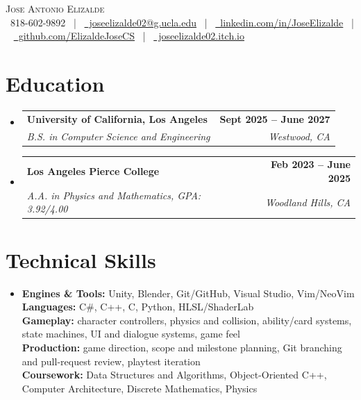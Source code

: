 \documentclass[letterpaper,11pt]{article}
\makeatletter
\newcommand{\resumeSubheading}[4]{
  \vspace{-4pt}\item
  \begin{tabular*}{1.0\textwidth}[t]{l@{\extracolsep{\fill}}r}
    \textbf{#1} & \textbf{\small #2} \\
    \textit{\small #3} & \textit{\small #4} \\
  \end{tabular*}\vspace{-7pt}
}
\newcommand{\resumeSubHeadingListStart}{\begin{itemize}[leftmargin=0in, label={}]}
\newcommand{\resumeSubHeadingListEnd}{\end{itemize}}
\makeatother
\begin{document}
\begin{center}
    {\huge \scshape Jose Antonio Elizalde} \\ \vspace{0pt}
    \small
    \faPhone\ 818-602-9892 ~|~
    \href{mailto:joseelizalde02@g.ucla.edu}{\faEnvelope\ joseelizalde02@g.ucla.edu} ~|~
    \href{https://www.linkedin.com/in/jose-elizalde-184781342/}{\faLinkedin\ linkedin.com/in/JoseElizalde} ~|~
    \href{https://github.com/ElizaldeJoseCS}{\faGithub\ github.com/ElizaldeJoseCS} ~|~
    \href{https://joseelizalde02.itch.io/}{\faGamepad\ joseelizalde02.itch.io}
\end{center}

\section{Education}
\resumeSubHeadingListStart
  \resumeSubheading
    {University of California, Los Angeles}{Sept 2025 -- June 2027}
    {B.S. in Computer Science and Engineering}{Westwood, CA}
  \resumeSubheading
    {Los Angeles Pierce College}{Feb 2023 -- June 2025}
    {A.A. in Physics and Mathematics, GPA: 3.92/4.00}{Woodland Hills, CA}
\resumeSubHeadingListEnd

\section{Technical Skills}
\begin{itemize}[leftmargin=0.15in, label={}]
  \item \small{
    \textbf{Engines \& Tools:} Unity, Blender, Git/GitHub, Visual Studio, Vim/NeoVim \\
    \textbf{Languages:} C\#, C++, C, Python, HLSL/ShaderLab \\
    \textbf{Gameplay:} character controllers, physics and collision, ability/card systems, state machines, UI and dialogue systems, game feel \\
    \textbf{Production:} game direction, scope and milestone planning, Git branching and pull-request review, playtest iteration \\
    \textbf{Coursework:} Data Structures and Algorithms, Object-Oriented C++, Computer Architecture, Discrete Mathematics, Physics \\
  }
\end{itemize}

\end{document}
